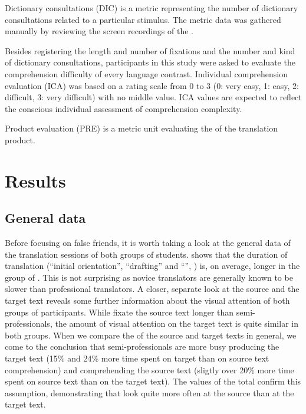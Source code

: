\documentclass[output=paper]{langsci/langscibook.cls}
\begin{document}
Dictionary consultations (DIC) is a metric representing the number of dictionary consultations related to a particular stimulus. The metric data was gathered manually by reviewing the screen recordings of the . 

\newpage 
Besides registering the length and number of fixations and the number and kind of dictionary consultations, participants in this study were asked to evaluate the comprehension difficulty of every language contrast. Individual comprehension evaluation (ICA) was based on a rating scale from 0 to 3 (0: very easy, 1: easy, 2: difficult, 3: very difficult) with no middle value. ICA values are expected to reflect the conscious individual assessment of comprehension complexity. 

Product evaluation (PRE) is a metric unit evaluating the  of the translation product.



\section{Results}

\subsection{General data} 

Before focusing on false friends, it is worth taking a look at the general data of the translation sessions of both groups of students.  shows that the duration of translation (``initial orientation'', ``drafting'' and ``'', \citealt{Jakobsen2002Orientation}) is, on average, longer in the group of . This is not surprising as novice translators are generally known to be slower than professional translators. A closer, separate look at the source and the target text reveals some further information about the visual attention of both groups of participants. While  fixate the source text longer than semi-professionals, the amount of visual attention on the target text is quite similar in both groups. When we compare the  of the source and target texts in general, we come to the conclusion that semi-professionals are more busy producing the target text (15\% and 24\% more time spent on target  than on source text comprehension) and  comprehending the source text (sligtly over 20\% more time spent on source text than on the target text). The values of the total  confirm this assumption, demonstrating that  look quite more often at the source than at the target text. 
\end{document}
